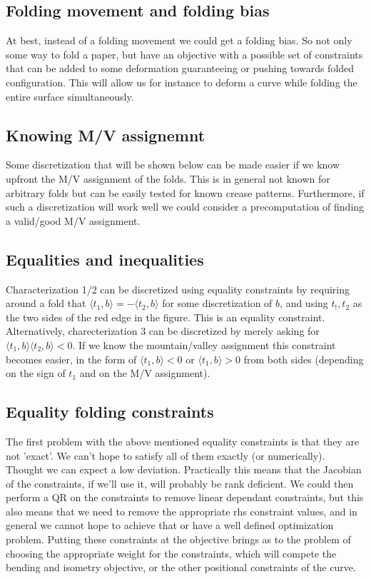 \documentclass{article}
\theoremstyle{definition}
\begin{document}
\subsection{Folding movement and folding bias}
At best, instead of a folding movement we could get a folding bias. So not only some way to fold a paper, but have an objective with a possible set of constraints that can be added to some deformation guaranteeing or pushing towards folded configuration. This will allow us for instance to deform a curve while folding the entire surface simultaneously.

\subsection{Knowing M/V assignemnt}
Some discretization that will be shown below can be made easier if we know upfront the M/V assignment of the folds. This is in general not known for arbitrary folds but can be easily tested for known crease patterns. Furthermore, if such a discretization will work well we could consider a precomputation of finding a valid/good M/V assignment.

\subsection{Equalities and inequalities}
Characterization 1/2 can be discretized using equality constraints by requiring around a fold that  $\langle t_1,b \rangle = -\langle t_2,b \rangle$ for some discretization of $b$, and using $t_!,t_2$ as the two sides of the red edge in the figure. This is an equality constraint. Alternatively, charecterization 3 can be discretized by merely asking for $\langle t_1,b \rangle \langle t_2,b \rangle < 0$. If we know the mountain/valley assignment this constraint becomes easier, in the form of $\langle t_1,b \rangle < 0$ or $\langle t_1,b \rangle > 0$ from both sides (depending on the sign of $t_1$ and on the M/V assignment).

\subsection{Equality folding constraints}
The first problem with the above mentioned equality constraints is that they are not 'exact'. We can't hope to satisfy all of them exactly (or numerically). Thought we can expect a low deviation. Practically this means that the Jacobian of the constraints, if we'll use it, will probably be rank deficient. We could then perform a QR on the constraints to remove linear dependant constraints, but this also means that we need to remove the appropriate rhs constraint values, and in general we cannot hope to achieve that or have a well defined optimization problem. Putting these constraints at the objective brings as to the problem of choosing the appropriate weight for the constraints, which will compete the bending and isometry objective, or the other positional constraints of the curve.
\end{document}
